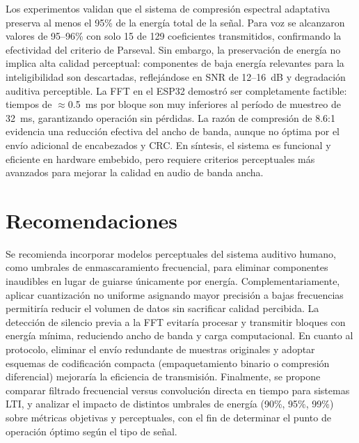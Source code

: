 \documentclass[12pt, journal]{IEEEtran}
\begin{document}
Los experimentos validan que el sistema de compresión espectral adaptativa preserva
al menos el 95\% de la energía total de la señal. Para voz se alcanzaron valores
de 95–96\% con solo 15 de 129 coeficientes transmitidos, confirmando la efectividad
del criterio de Parseval. Sin embargo, la preservación de energía no implica alta
calidad perceptual: componentes de baja energía relevantes para la inteligibilidad
son descartadas, reflejándose en SNR de 12–16~dB y degradación auditiva perceptible.
La FFT en el ESP32 demostró ser completamente factible: tiempos de $\approx$0.5~ms
por bloque son muy inferiores al período de muestreo de 32~ms, garantizando
operación sin pérdidas. La razón de compresión de 8.6:1 evidencia una reducción
efectiva del ancho de banda, aunque no óptima por el envío adicional de encabezados
y CRC. En síntesis, el sistema es funcional y eficiente en hardware embebido, pero
requiere criterios perceptuales más avanzados para mejorar la calidad en audio de
banda ancha.

\section{Recomendaciones}

Se recomienda incorporar modelos perceptuales del sistema auditivo humano, como
umbrales de enmascaramiento frecuencial, para eliminar componentes inaudibles en
lugar de guiarse únicamente por energía. Complementariamente, aplicar cuantización
no uniforme asignando mayor precisión a bajas frecuencias permitiría reducir el
volumen de datos sin sacrificar calidad percibida. La detección de silencio previa
a la FFT evitaría procesar y transmitir bloques con energía mínima, reduciendo
ancho de banda y carga computacional. En cuanto al protocolo, eliminar el envío
redundante de muestras originales y adoptar esquemas de codificación compacta
(empaquetamiento binario o compresión diferencial) mejoraría la eficiencia de
transmisión. Finalmente, se propone comparar filtrado frecuencial versus convolución
directa en tiempo para sistemas LTI, y analizar el impacto de distintos umbrales
de energía (90\%, 95\%, 99\%) sobre métricas objetivas y perceptuales, con el fin
de determinar el punto de operación óptimo según el tipo de señal.


\end{document}
